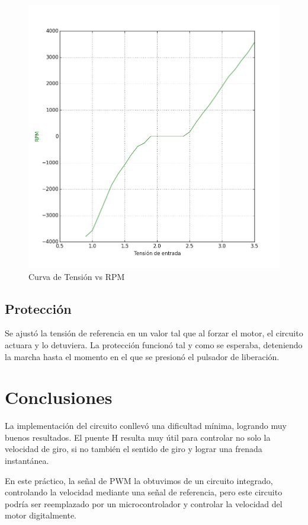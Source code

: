 \documentclass[11pt, a4paper]{article}
\begin{document}
\begin{figure}[h]
	\centering
	\includegraphics[width=15cm]{Imagenes/rpm.png}
	\caption{Curva de Tensión vs RPM}
	\label{fig:rpm}
\end{figure} 


\subsection{Protección}
Se ajustó la tensión de referencia en un valor tal que al forzar el motor, el circuito actuara y lo detuviera. La protección funcionó tal y como se esperaba, deteniendo la marcha hasta el momento en el que se presionó el pulsador de liberación.


\section{Conclusiones}
La implementación del circuito conllevó una dificultad mínima, logrando muy buenos resultados. El puente H resulta muy útil para controlar no solo la velocidad de giro, si no también el sentido de giro y lograr una frenada instantánea.

En este práctico, la señal de PWM la obtuvimos de un circuito integrado, controlando la velocidad mediante una señal de referencia, pero este circuito podría ser reemplazado por un microcontrolador y controlar la velocidad del motor digitalmente.
\end{document}
